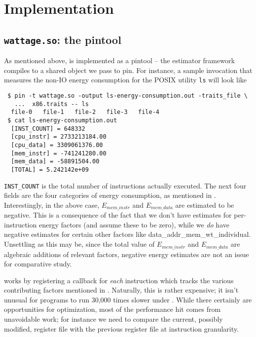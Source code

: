 \section{Implementation}

\subsection{\texttt{wattage.so}: the pintool}

As mentioned above, \wattage is implemented as a pintool -- the
estimator framework compiles to a shared object we pass to pin.  For
instance, a sample invocation that measures the non-IO energy
consumption for the POSIX utility \texttt{ls} will look like

\begin{verbatim}
 $ pin -t wattage.so -output ls-energy-consumption.out -traits_file \
   ...  x86.traits -- ls
  file-0   file-1   file-2   file-3   file-4
 $ cat ls-energy-consumption.out
  [INST_COUNT] = 648332
  [cpu_instr] = 2733213184.00
  [cpu_data] = 3309061376.00
  [mem_instr] = -741241280.00
  [mem_data] = -58891504.00
  [TOTAL] = 5.242142e+09
\end{verbatim}

\texttt{INST\_COUNT} is the total number of instructions actually
executed.  The next four fields are the four categories of energy
consumption, as mentioned in \refsec{lst:fields-desc}.  Interestingly,
in the above case, $E_{mem\_instr}$ and $E_{mem\_data}$ are estimated
to be negative.  This is a consequence of the fact that we don't have
estimates for per-instruction energy factors (and assume these to be
zero), while we \textit{do} have negative estimates for certain other
factors like {data\_addr\_mem\_wt\_individual}.  Unsettling as this
may be, since the total value of $E_{mem\_instr}$ and $E_{mem\_data}$
are algebraic additions of relevant factors, negative energy estimates
are not an issue for comparative study.

\wattage works by registering a callback for \textit{each} instruction
which tracks the various contributing factors mentioned in
\cite{steinke}.  Naturally, this is rather expensive; it isn't unusual
for programs to run 30,000 times slower under \wattage.  While there
certainly are opportunities for optimization, most of the performance
hit comes from unavoidable work; for instance we need to compare the
current, possibly modified, register file with the previous register
file at instruction granularity.


